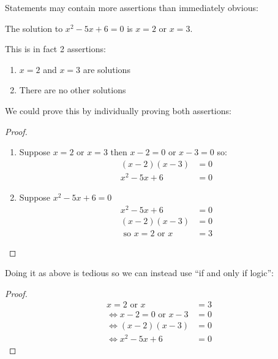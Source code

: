 \documentclass[../main.tex]{subfiles}
\begin{document}
Statements may contain more assertions than immediately obvious:
\begin{proposition}
  The solution to $x^2 - 5x + 6 = 0$ is $x = 2$ or $x = 3$.
\end{proposition}
This is in fact 2 assertions:
\begin{enumerate}
  \item $x = 2$ and $x = 3$ are solutions
  \item There are no other solutions
\end{enumerate}
We could prove this by individually proving both assertions:
\begin{proof}
  \begin{enumerate}
    \item Suppose $x = 2$ or $x = 3$ then $x - 2 = 0$ or $x - 3 = 0$ so:
      \begin{align*}
        (x-2)(x-3) &= 0 \\
        x^2 - 5x + 6 &= 0
      \end{align*}
    \item Suppose $x^2 - 5x + 6 = 0$ 
      \begin{align*}
        x^2 - 5x + 6 &= 0 \\
        (x - 2)(x - 3) &= 0 \\
        \text{ so } x = 2 \text{ or } x &= 3
      \end{align*}
  \end{enumerate}
\end{proof}
Doing it as above is tedious so we can instead use ``if and only if logic'':
\begin{proof}
  \begin{align*}
    x = 2 \text{ or } x &= 3 \\
    \iff x - 2 = 0 \text{ or } x - 3 &= 0 \\
    \iff (x - 2)(x - 3) &= 0 \\
    \iff x^2 - 5x + 6 &= 0
  \end{align*}
\end{proof}
\end{document}
